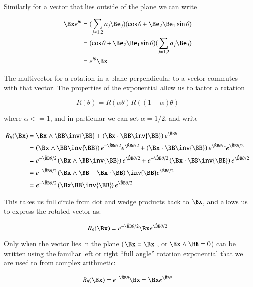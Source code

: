 Similarly for a vector that lies outside of the plane we can write

\begin{align*}
\Bx e^{i\theta} 
&= (\sum_{j \ne 1,2} a_j \Be_j)(\cos\theta + \Be_2 \Be_1\sin\theta) \\
&= (\cos\theta + \Be_2 \Be_1\sin\theta) (\sum_{j \ne 1,2} a_j \Be_j) \\
&= e^{i\theta}\Bx
\end{align*}

The multivector for a rotation in a plane perpendicular to a vector commutes with that vector.  The properties of the 
exponential allow us to factor a rotation

\[
R(\theta) = R(\alpha\theta) R((1-\alpha)\theta)
\]

where $\alpha <= 1$, and in particular we can set $\alpha = 1/2$, and write

\begin{align*}
R_\theta(\Bx) 
&= \Bx \wedge \BB \inv{\BB} + \left(\Bx \cdot \BB \inv{\BB}\right)e^{\hat{\BB}\theta} \\
&= \left(\Bx \wedge \BB \inv{\BB}\right) e^{-\hat{\BB}\theta/2} e^{\hat{\BB}\theta/2} 
 + \left(\Bx \cdot \BB \inv{\BB} \right) e^{\hat{\BB}\theta/2} e^{\hat{\BB}\theta/2} \\
&= e^{-\hat{\BB}\theta/2} \left(\Bx \wedge \BB \inv{\BB}\right) e^{\hat{\BB}\theta/2}  
+ e^{-\hat{\BB}\theta/2} \left(\Bx \cdot \BB \inv{\BB}\right)e^{\hat{\BB}\theta/2} \\
&= e^{-\hat{\BB}\theta/2} \left(\Bx \wedge \BB + \Bx \cdot \BB\right) \inv{\BB} e^{\hat{\BB}\theta/2} \\
&= e^{-\hat{\BB}\theta/2} \left(\Bx \BB \inv{\BB} \right) e^{\hat{\BB}\theta/2}  
\end{align*}

This takes us full circle from dot and wedge products back to $\Bx$, and allows us to express the rotated vector as:

\begin{equation}\label{eqn:rotor:rotor}
R_\theta(\Bx) 
= e^{-\hat{\BB}\theta/2} \Bx e^{\hat{\BB}\theta/2}
\end{equation}

Only when the vector lies in the plane ($\Bx = \Bx_\parallel$, or $\Bx \wedge \BB = 0$) can be written using the familiar left or right ``full angle'' rotation exponential that we are used to from complex arithmetic:

\[
R_\theta(\Bx) = e^{-\hat{\BB}\theta} \Bx = \Bx e^{\hat{\BB}\theta}
\]

